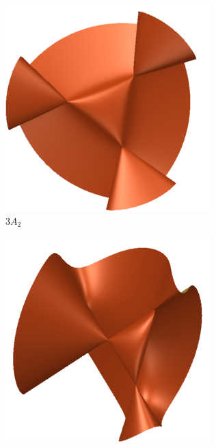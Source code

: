 \documentclass[11pt,reqno, letterpaper]{amsart}
\numberwithin{equation}{section}
\begin{document}
\begin{figure}
  \begin{subfigure}{.24\textwidth}
    \centering
    \includegraphics[width=\textwidth]{cubic3A2}
    \caption{$3A_2$}
  \end{subfigure}
  \begin{subfigure}{.24\textwidth}
    \centering
    \includegraphics[width=\textwidth]{cubicA3_2A1}

\end{subfigure}
\end{figure}
\end{document}
